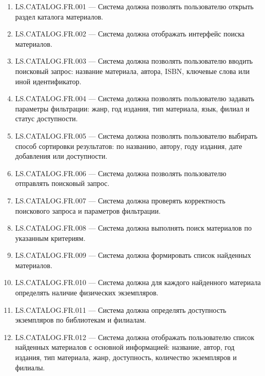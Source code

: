 \documentclass[12pt,a4paper]{article}
\begin{document}
	
	\begin{enumerate}
		\item LS.CATALOG.FR.001 --- Система должна позволять пользователю открыть
		раздел каталога материалов.
		
		\item LS.CATALOG.FR.002 --- Система должна отображать интерфейс поиска
		материалов.
		
		\item LS.CATALOG.FR.003 --- Система должна позволять пользователю вводить
		поисковый запрос: название материала, автора, ISBN, ключевые слова или иной
		идентификатор.
		
		\item LS.CATALOG.FR.004 --- Система должна позволять пользователю задавать
		параметры фильтрации: жанр, год издания, тип материала, язык, филиал и статус
		доступности.
		
		\item LS.CATALOG.FR.005 --- Система должна позволять пользователю выбирать
		способ сортировки результатов: по названию, автору, году издания, дате
		добавления или доступности.
		
		\item LS.CATALOG.FR.006 --- Система должна позволять пользователю отправлять
		поисковый запрос.
		
		\item LS.CATALOG.FR.007 --- Система должна проверять корректность поискового
		запроса и параметров фильтрации.
		
		\item LS.CATALOG.FR.008 --- Система должна выполнять поиск материалов по
		указанным критериям.
		
		\item LS.CATALOG.FR.009 --- Система должна формировать список найденных
		материалов.
		
		\item LS.CATALOG.FR.010 --- Система должна для каждого найденного материала
		определять наличие физических экземпляров.
		
		\item LS.CATALOG.FR.011 --- Система должна определять доступность экземпляров
		по библиотекам и филиалам.
		
		\item LS.CATALOG.FR.012 --- Система должна отображать пользователю список
		найденных материалов с основной информацией: название, автор, год издания,
		тип материала, жанр, доступность, количество экземпляров и филиалы.
		

\end{enumerate}
\end{document}
